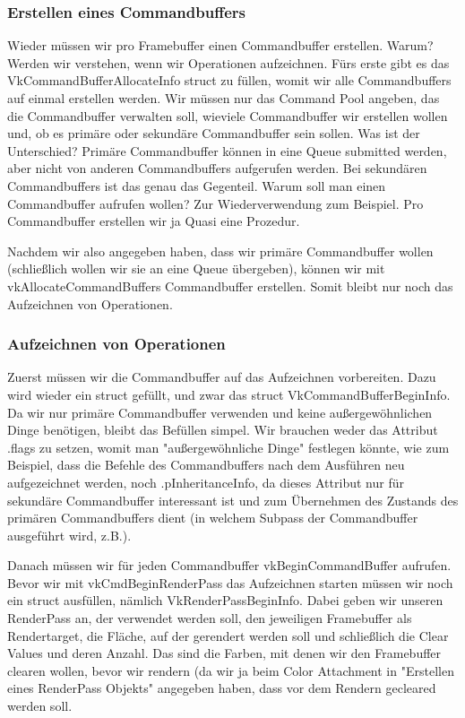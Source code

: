 \documentclass[11pt,a4paper]{report}
\begin{document}
\subsubsection{Erstellen eines Commandbuffers}
Wieder müssen wir pro Framebuffer einen Commandbuffer erstellen. Warum? Werden wir verstehen, wenn wir Operationen aufzeichnen. Fürs erste gibt es das VkCommandBufferAllocateInfo struct zu füllen, womit wir alle Commandbuffers auf einmal erstellen werden. Wir müssen nur das Command Pool angeben, das die Commandbuffer verwalten soll, wieviele Commandbuffer wir erstellen wollen und, ob es primäre oder sekundäre Commandbuffer sein sollen. Was ist der Unterschied? Primäre Commandbuffer können in eine Queue submitted werden, aber nicht von anderen Commandbuffers aufgerufen werden. Bei sekundären Commandbuffers ist das genau das Gegenteil. Warum soll man einen Commandbuffer aufrufen wollen? Zur Wiederverwendung zum Beispiel. Pro Commandbuffer erstellen wir ja Quasi eine Prozedur.

Nachdem wir also angegeben haben, dass wir primäre Commandbuffer wollen (schließlich wollen wir sie an eine Queue übergeben), können wir mit vkAllocateCommandBuffers Commandbuffer erstellen. Somit bleibt nur noch das Aufzeichnen von Operationen.

\subsubsection{Aufzeichnen von Operationen}
Zuerst müssen wir die Commandbuffer auf das Aufzeichnen vorbereiten. Dazu wird wieder ein struct gefüllt, und zwar das struct VkCommandBufferBeginInfo. Da wir nur primäre Commandbuffer verwenden und keine außergewöhnlichen Dinge benötigen, bleibt das Befüllen simpel. Wir brauchen weder das Attribut .flags zu setzen, womit man "außergewöhnliche Dinge" festlegen könnte, wie zum Beispiel, dass die Befehle des Commandbuffers nach dem Ausführen neu aufgezeichnet werden, noch .pInheritanceInfo, da dieses Attribut nur für sekundäre Commandbuffer interessant ist und zum Übernehmen des Zustands des primären Commandbuffers dient (in welchem Subpass der Commandbuffer ausgeführt wird, z.B.).

Danach müssen wir für jeden Commandbuffer vkBeginCommandBuffer aufrufen. Bevor wir mit vkCmdBeginRenderPass das Aufzeichnen starten müssen wir noch ein struct ausfüllen, nämlich VkRenderPassBeginInfo. Dabei geben wir unseren RenderPass an, der verwendet werden soll, den jeweiligen Framebuffer als Rendertarget, die Fläche, auf der gerendert werden soll und schließlich die Clear Values und deren Anzahl. Das sind die Farben, mit denen wir den Framebuffer clearen wollen, bevor wir rendern (da wir ja beim Color Attachment in "Erstellen eines RenderPass Objekts" angegeben haben, dass vor dem Rendern gecleared werden soll.
\end{document}
